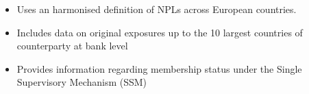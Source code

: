 \documentclass[aspectratio=169]{beamer}\usepackage[]{graphicx}\usepackage[]{color}
\begin{document}
{\begin{itemize}
\begin{itemize}
   \item Uses an harmonised definition of NPLs across European countries.
   
   \item Includes data on original exposures up to the 10 largest countries of counterparty at bank level
    \item Provides information regarding membership status under the Single Supervisory Mechanism (SSM)
   
    \end{itemize}

 
 
 \end{itemize}
}


% 
% 
% 
% 
% 
%         
% 
% 
\end{document}
